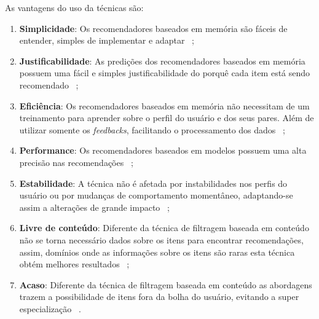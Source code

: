 As vantagens do uso da técnicas são:
\begin{enumerate}
    \item \textbf{Simplicidade}: Os recomendadores baseados em memória são fáceis de entender, simples de implementar e adaptar~ \cite{Isinkaye:2015, Desrosiers:2011, Su:2009};
    
    \item \textbf{Justificabilidade}: As predições dos recomendadores baseados em memória possuem uma fácil e simples justificabilidade do porquê cada item está sendo recomendado~ \cite{Desrosiers:2011};
    
    \item \textbf{Eficiência}: Os recomendadores baseados em memória não necessitam de um treinamento para aprender sobre o perfil do usuário e dos seus pares. Além de utilizar somente os \textit{feedbacks}, facilitando o processamento dos dados~ \cite{Desrosiers:2011};
    
    \item \textbf{Performance}: Os recomendadores baseados em modelos possuem uma alta precisão nas recomendações~ \cite{Su:2009};
    
    \item \textbf{Estabilidade}: A técnica não é afetada por instabilidades nos perfis do usuário ou por mudanças de comportamento momentâneo, adaptando-se assim a alterações de grande impacto~ \cite{Desrosiers:2011};
    
    \item \textbf{Livre de conteúdo}: Diferente da técnica de filtragem baseada em conteúdo não se torna necessário dados sobre os itens para encontrar recomendações, assim, domínios onde as informações sobre os itens são raras esta técnica obtém melhores resultados~ \cite{Isinkaye:2015, Su:2009};
    
    \item \textbf{Acaso}: Diferente da técnica de filtragem baseada em conteúdo as abordagens trazem a possibilidade de itens fora da bolha do usuário, evitando a super especialização~ \cite{Isinkaye:2015, Desrosiers:2011}.
\end{enumerate}

